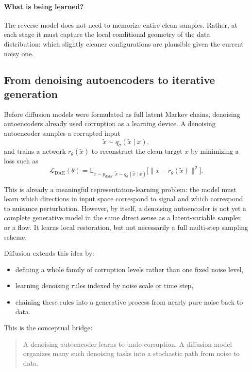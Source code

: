 \paragraph{What is being learned?}
The reverse model does not need to memorize entire clean samples.
Rather, at each stage it must capture the local conditional geometry of the data distribution:
which slightly cleaner configurations are plausible given the current noisy one.

\subsection*{From denoising autoencoders to iterative generation}

Before diffusion models were formulated as full latent Markov chains, denoising autoencoders already used corruption as a learning device.
A denoising autoencoder samples a corrupted input
\[
\tilde x\sim q_\sigma(\tilde x\mid x),
\]
and trains a network $r_\theta(\tilde x)$ to reconstruct the clean target $x$ by minimizing a loss such as
\[
\mathcal{L}_{\mathrm{DAE}}(\theta)
=
\mathbb{E}_{x\sim p_{\mathrm{data}},\,\tilde x\sim q_\sigma(\tilde x\mid x)}
\bigl[\|x-r_\theta(\tilde x)\|^2\bigr].
\]

This is already a meaningful representation-learning problem:
the model must learn which directions in input space correspond to signal and which correspond to nuisance perturbation.
However, by itself, a denoising autoencoder is not yet a complete generative model in the same direct sense as a latent-variable sampler or a flow.
It learns local restoration, but not necessarily a full multi-step sampling scheme.

Diffusion extends this idea by:
\begin{itemize}
    \item defining a whole family of corruption levels rather than one fixed noise level,
    \item learning denoising rules indexed by noise scale or time step,
    \item chaining these rules into a generative process from nearly pure noise back to data.
\end{itemize}

\medskip

This is the conceptual bridge:
\begin{quote}
A denoising autoencoder learns to undo corruption. A diffusion model organizes many such denoising tasks into a stochastic path from noise to data.
\end{quote}


